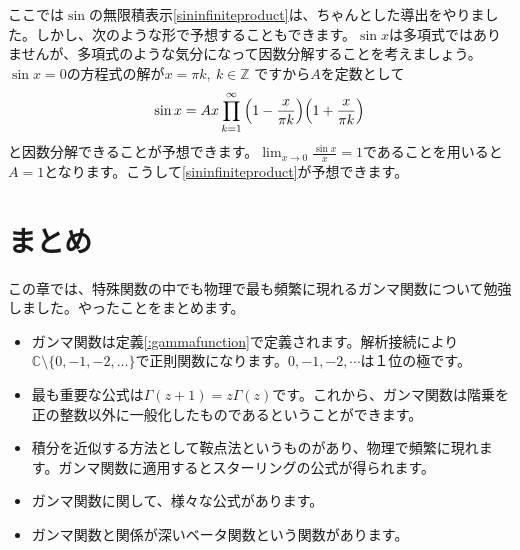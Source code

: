 \documentclass[report,paper=a4, fontsize=12pt, line_length=16cm, number_of_lines=33,dvipdfmx]{jlreq}
\numberwithin{equation}{section}
\newcommand{\Cb}{\mathbb{C}}
\newcommand{\Zb}{\mathbb{Z}}
\begin{document}
ここでは$\sin$の無限積表示\eqref{sininfiniteproduct}は、ちゃんとした導出をやりました。しかし、次のような形で予想することもできます。$\sin x$は多項式ではありませんが、多項式のような気分になって因数分解することを考えましょう。$\sin x=0$の方程式の解が$x=\pi k,\ k\in \Zb$
ですから$A$を定数として
\begin{align}
  \sin x = A x \prod_{k=1}^{\infty}\qty(1-\frac{x}{\pi k})\qty(1+\frac{x}{\pi k})
\end{align}
と因数分解できることが予想できます。$\lim_{x\to 0}\frac{\sin x}{x}=1$であることを用いると$A=1$となります。こうして\eqref{sininfiniteproduct}が予想できます。

\section{まとめ}
この章では、特殊関数の中でも物理で最も頻繁に現れるガンマ関数について勉強しました。やったことをまとめます。
\begin{itemize}
  \item ガンマ関数は定義\ref{:gammafunction}で定義されます。解析接続により$\Cb\setminus \{0,-1,-2,\dots\}$で正則関数になります。$0,-1,-2,\cdots$は１位の極です。
  \item 最も重要な公式は$\Gamma(z+1)=z\Gamma(z)$です。これから、ガンマ関数は階乗を正の整数以外に一般化したものであるということができます。
  \item 積分を近似する方法として鞍点法というものがあり、物理で頻繁に現れます。ガンマ関数に適用するとスターリングの公式が得られます。
  \item ガンマ関数に関して、様々な公式があります。
  \item ガンマ関数と関係が深いベータ関数という関数があります。
\end{itemize}
\end{document}
